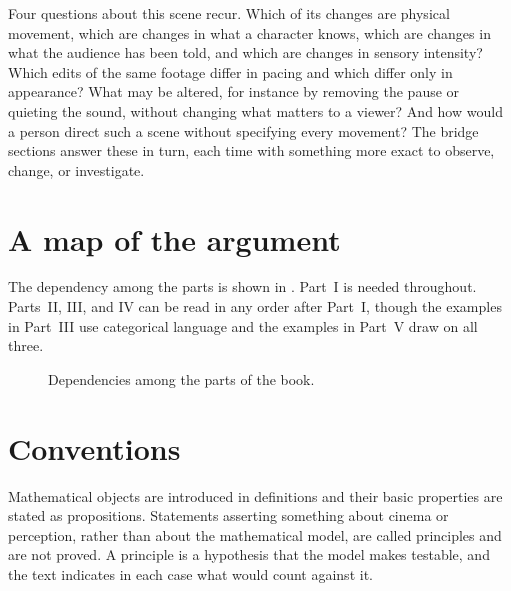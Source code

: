 Four questions about this scene recur. Which of its changes are physical movement, which are changes in what a character knows, which are changes in what the audience has been told, and which are changes in sensory intensity? Which edits of the same footage differ in pacing and which differ only in appearance? What may be altered, for instance by removing the pause or quieting the sound, without changing what matters to a viewer? And how would a person direct such a scene without specifying every movement? The bridge sections answer these in turn, each time with something more exact to observe, change, or investigate.

\section{A map of the argument}

The dependency among the parts is shown in . Part~I is needed throughout. Parts~II, III, and IV can be read in any order after Part~I, though the examples in Part~III use categorical language and the examples in Part~V draw on all three.

\begin{figure}[ht]
\centering
{}
\caption{Dependencies among the parts of the book.}
\label{fig:map}
\end{figure}

\section{Conventions}

Mathematical objects are introduced in definitions and their basic properties are stated as propositions. Statements asserting something about cinema or perception, rather than about the mathematical model, are called principles and are not proved. A principle is a hypothesis that the model makes testable, and the text indicates in each case what would count against it.

